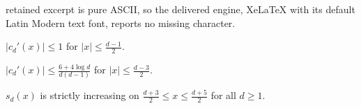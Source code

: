 \documentclass[10pt,a4paper]{amsart}
\begin{document}
retained excerpt is pure ASCII, so the delivered engine, XeLaTeX with its default Latin Modern text font, reports no missing character.
 \begin{lemma}
    $|c_{d}'(x)| \leq 1 $ for $|x|\leq \frac{d-1}{2}$.
\label{lem:first_cd_derivative_bound}
\end{lemma}

\begin{lemma}
    $|c_{d}'(x)| \leq  \frac{6+4\log d}{d(d-1)}$ for $|x|\leq \frac{d-3}{2}$.
\label{lem:second_cd_derivative_bound}
\end{lemma}

\begin{lemma}
    $s_d(x)$ is strictly increasing on $\frac{d+3}{2}\leq x \leq \frac{d+5}{2}$ for all $d\geq 1$.

\label{lem:sd_increasing_intvofsize1}
 \end{lemma}
\end{document}
